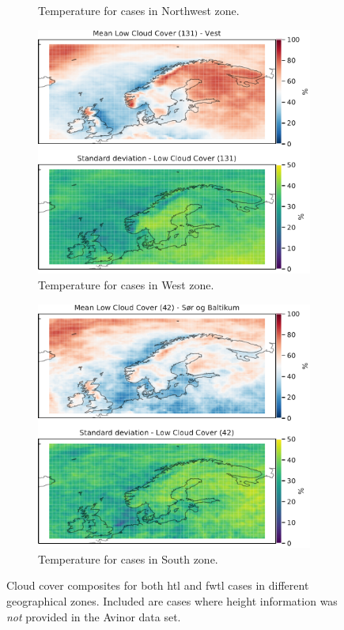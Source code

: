 \begin{figure}
\begin{subfigure}[b]{0.49\textwidth}
    \caption{Temperature for cases in Northwest zone.}
    \label{fig:NordWestCC}
\end{subfigure}
\begin{subfigure}[b]{0.49\textwidth}
    \centering
    \includegraphics[width=\textwidth]{Figures/CCVest.pdf}
    \caption{Temperature for cases in West zone.}
    \label{fig:WestCC}
\end{subfigure}
\begin{subfigure}[b]{0.49\textwidth}
    \centering
    \includegraphics[width=\textwidth]{Figures/CCSor.pdf}
    \caption{Temperature for cases in South zone.}
    \label{fig:SouthCC}
\end{subfigure}
\caption{Cloud cover composites for both \acrshort{htl} and \acrshort{fwtl} cases in different geographical zones. Included are cases where height information was \textit{not} provided in the Avinor data set.}
\label{fig:cloudcoverzones}
\end{figure}

